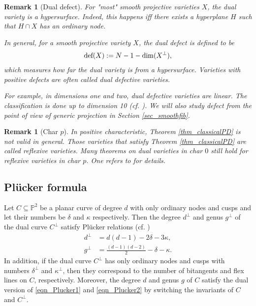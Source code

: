 \documentclass[12pt]{amsart}
\newcommand{\ddef}{\textup{def}}
\newtheorem{remark}[theorem]{Remark}
\begin{document}
\begin{remark}[Dual defect]\normalfont\label{remark_defect}
    For "most" smooth projective varieties $X$, the dual variety is a hypersurface. Indeed, this happens iff there exists a hyperplane $H$ such that $H\cap X$ has an ordinary node. 
    
    In general, for a smooth projective variety $X$, the \textit{dual defect} is defined to be $$\ddef(X):=N-1-\dim(X^{\perp}),$$
   which measures how far the dual variety is from a hypersurface. Varieties with positive defects are often called \textit{dual defective varieties}.

   For example, in dimensions one and two, dual defective varieties are linear. The classification is done up to dimension 10 (cf. \cite{Ein86,Ein85,LanStr87,BMF92}). We will also study defect from the point of view of generic projection in Section \ref{sec_smoothfib}. 
    
    
    

\end{remark}
\begin{remark}[Char $p$]\normalfont
   In positive characteristic, Theorem \ref{thm_classicalPD} is not valid in general. Those varieties that satisfy Theorem \ref{thm_classicalPD} are called \textit{reflexive varieties}. Many theorems on dual varieties in char $0$ still hold for reflexive varieties in char $p$. One refers to \cite{Kle86,HK85} for details.
\end{remark}

\subsection{Pl\"ucker formula}
Let $C\subseteq \mathbb P^2$ be a planar curve of degree $d$ with only ordinary nodes and cusps and let their numbers be $\delta$ and $\kappa$ respectively. Then the degree $d^{\perp}$ and genus $g^{\perp}$ of the dual curve $C^{\perp}$ satisfy Pl\"ucker relations (cf.  \cite{Dolgachev-classicalAG} \cite{Kle77})
 \begin{align}
d^{\perp}&=d(d-1)-2\delta-3\kappa,\label{eqn_Plucker1}\\
g^{\perp}&=\frac{(d-1)(d-2)}{2} -\delta-\kappa.\label{eqn_Plucker2}
\end{align}
In addition, if the dual curve $C^{\perp}$ has only ordinary nodes and cusps with numbers $\delta^{\perp}$ and $\kappa^{\perp}$, then they correspond to the number of  bitangents and flex lines on $C$, respectively. Moreover, the degree $d$ and genus $g$ of $C$ satisfy the dual version of \eqref{eqn_Plucker1} and \eqref{eqn_Plucker2} by switching the invariants of $C$ and $C^{\perp}$.
\end{document}
